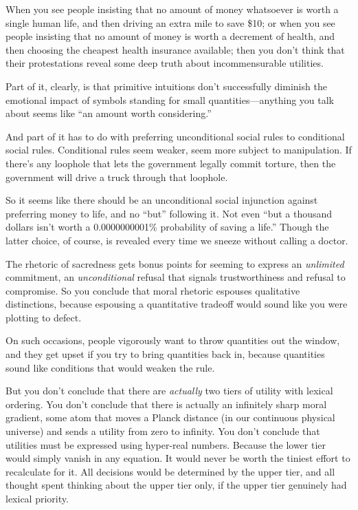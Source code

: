 {
 When you see people insisting that no amount of money whatsoever
is worth a single human life, and then driving an extra mile to save
\$10; or when you see people insisting that no amount of money is worth
a decrement of health, and then choosing the cheapest health insurance
available; then you don't think that their
protestations reveal some deep truth about incommensurable utilities.}

{
 Part of it, clearly, is that primitive intuitions
don't successfully diminish the emotional impact of
symbols standing for small quantities---anything you talk about seems
like ``an amount worth
considering.''}

{
 And part of it has to do with preferring unconditional social
rules to conditional social rules. Conditional rules seem weaker, seem
more subject to manipulation. If there's any loophole
that lets the government legally commit torture, then the government
will drive a truck through that loophole.}

{
 So it seems like there should be an unconditional social
injunction against preferring money to life, and no
``but'' following it. Not even
``but a thousand dollars isn't worth a
0.0000000001\% probability of saving a life.'' Though
the latter choice, of course, is revealed every time we sneeze without
calling a doctor.}

{
 The rhetoric of sacredness gets bonus points for seeming to
express an \textit{unlimited} commitment, an \textit{unconditional}
refusal that signals trustworthiness and refusal to compromise. So you
conclude that moral rhetoric espouses qualitative distinctions, because
espousing a quantitative tradeoff would sound like you were plotting to
defect.}

{
 On such occasions, people vigorously want to throw quantities out
the window, and they get upset if you try to bring quantities back in,
because quantities sound like conditions that would weaken the rule.}

{
 But you don't conclude that there are
\textit{actually} two tiers of utility with lexical ordering. You
don't conclude that there is actually an infinitely
sharp moral gradient, some atom that moves a Planck distance (in our
continuous physical universe) and sends a utility from zero to
infinity. You don't conclude that utilities must be
expressed using hyper-real numbers. Because the lower tier would simply
vanish in any equation. It would never be worth the tiniest effort to
recalculate for it. All decisions would be determined by the upper
tier, and all thought spent thinking about the upper tier only, if the
upper tier genuinely had lexical priority.}

